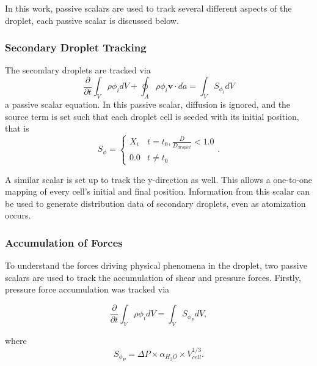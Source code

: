 \documentclass{UCF_ETD}
\begin{document}
In this work, passive scalars are used to track several different aspects of the droplet, each passive scalar is discussed below.
\subsubsection{Secondary Droplet Tracking}
\label{sec:secondDropTrack}

The secondary droplets are tracked via 
\begin{equation}
    \frac{\partial}{\partial t} \int_{V} \rho \phi_{i}dV + \oint_{A} \rho \phi_{i} \textbf{v} \cdot da = \int_{V} S_{\phi_{i}}dV
    \label{eq:secondDropPassiveScalar}
\end{equation}
a passive scalar equation. In this passive scalar, diffusion is ignored, and the source term is set such that each droplet cell is seeded with its initial position, that is 
\begin{equation}
    S_{\phi} = \begin{cases}
        X_{i} & t = t_{0}, \frac{D}{D_{droplet}} < 1.0 \\
        0.0 & t \neq t_{0} 
    \end{cases}.
    \label{eq:diffusionSource}
\end{equation}

A similar scalar is set up to track the y-direction as well. This allows a one-to-one mapping of every cell's initial and final position. Information from this scalar can be used to generate distribution data of secondary droplets, even as atomization occurs.



\subsubsection{Accumulation of Forces}
\label{sec:force_accum}
To understand the forces driving physical phenomena in the droplet, two passive scalars are used to track the accumulation of shear and pressure forces.
Firstly, pressure force accumulation was tracked via

\begin{equation}
    \frac{\partial}{\partial t} \int_{V} \rho \phi_{i}dV = \int_{V} S_{\phi_{P}}dV,
    \label{eq:pressureScalar}
\end{equation}

\noindent where 
\begin{equation}
    S_{\phi_{P}} = \Delta P \times \alpha_{H_{2}O}\times V_{cell}^{1/3}.
    \label{eq:pressureSource}
\end{equation}
\end{document}
